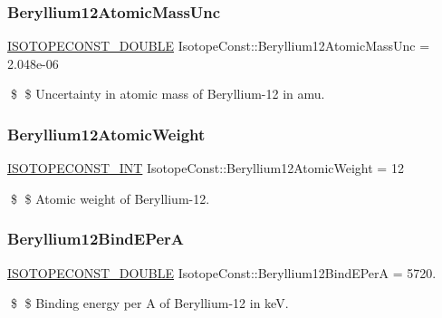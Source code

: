 \subsubsection{\texorpdfstring{Beryllium12\+Atomic\+Mass\+Unc}{Beryllium12AtomicMassUnc}}
{\footnotesize\ttfamily \mbox{\hyperlink{group___isotope_const-_macros_ga8f45a7272ce02c0b4c65c44636ed719a}{I\+S\+O\+T\+O\+P\+E\+C\+O\+N\+S\+T\+\_\+\+D\+O\+U\+B\+LE}} Isotope\+Const\+::\+Beryllium12\+Atomic\+Mass\+Unc = 2.\+048e-\/06}

\$ \$ Uncertainty in atomic mass of Beryllium-\/12 in amu. \mbox{\label{group___isotope_const-_beryllium-_be12_ga5ee194a7a8d3c456f05a9bff244ef5b2}} 
\subsubsection{\texorpdfstring{Beryllium12\+Atomic\+Weight}{Beryllium12AtomicWeight}}
{\footnotesize\ttfamily \mbox{\hyperlink{group___isotope_const-_macros_ga5f18360b3e99483a35c32d789e62621c}{I\+S\+O\+T\+O\+P\+E\+C\+O\+N\+S\+T\+\_\+\+I\+NT}} Isotope\+Const\+::\+Beryllium12\+Atomic\+Weight = 12}

\$ \$ Atomic weight of Beryllium-\/12. \mbox{\label{group___isotope_const-_beryllium-_be12_gac60f51b7c67cf8b86a3048637134e96c}} 
\subsubsection{\texorpdfstring{Beryllium12\+Bind\+E\+PerA}{Beryllium12BindEPerA}}
{\footnotesize\ttfamily \mbox{\hyperlink{group___isotope_const-_macros_ga8f45a7272ce02c0b4c65c44636ed719a}{I\+S\+O\+T\+O\+P\+E\+C\+O\+N\+S\+T\+\_\+\+D\+O\+U\+B\+LE}} Isotope\+Const\+::\+Beryllium12\+Bind\+E\+PerA = 5720.}

\$ \$ Binding energy per A of Beryllium-\/12 in keV. \mbox{\label{group___isotope_const-_beryllium-_be12_ga63ccd65c029cae40198d07d7f33943da}} 
